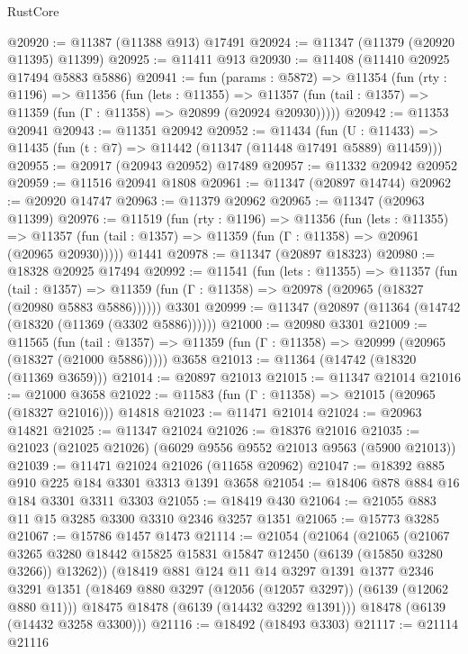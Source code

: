 \begin{lexlean}{RustCore}
\begin{coremodule}
@20920 := @11387 (@11388 @913) @17491
@20924 := @11347 (@11379 (@20920 @11395) @11399)
@20925 := @11411 @913
@20930 := @11408 (@11410 @20925 @17494 @5883 @5886)
@20941 := fun (params : @5872) =>
  @11354
    (fun (rty : @1196) =>
    @11356
      (fun (lets : @11355) =>
      @11357 (fun (tail : @1357) => @11359 (fun (Γ : @11358) => @20899 (@20924 @20930)))))
@20942 := @11353 @20941
@20943 := @11351 @20942
@20952 := @11434
    (fun (U : @11433) => @11435 (fun (t : @7) => @11442 (@11347 (@11448 @17491 @5889) @11459)))
@20955 := @20917 (@20943 @20952) @17489
@20957 := @11332 @20942 @20952
@20959 := @11516 @20941 @1808
@20961 := @11347 (@20897 @14744)
@20962 := @20920 @14747
@20963 := @11379 @20962
@20965 := @11347 (@20963 @11399)
@20976 := @11519
    (fun (rty : @1196) =>
    @11356
      (fun (lets : @11355) =>
      @11357 (fun (tail : @1357) => @11359 (fun (Γ : @11358) => @20961 (@20965 @20930)))))
    @1441
@20978 := @11347 (@20897 @18323)
@20980 := @18328 @20925 @17494
@20992 := @11541
    (fun (lets : @11355) =>
    @11357
      (fun (tail : @1357) =>
      @11359 (fun (Γ : @11358) => @20978 (@20965 (@18327 (@20980 @5883 @5886))))))
    @3301
@20999 := @11347 (@20897 (@11364 (@14742 (@18320 (@11369 (@3302 @5886))))))
@21000 := @20980 @3301
@21009 := @11565
    (fun (tail : @1357) => @11359 (fun (Γ : @11358) => @20999 (@20965 (@18327 (@21000 @5886)))))
    @3658
@21013 := @11364 (@14742 (@18320 (@11369 @3659)))
@21014 := @20897 @21013
@21015 := @11347 @21014
@21016 := @21000 @3658
@21022 := @11583 (fun (Γ : @11358) => @21015 (@20965 (@18327 @21016))) @14818
@21023 := @11471 @21014
@21024 := @20963 @14821
@21025 := @11347 @21024
@21026 := @18376 @21016
@21035 := @21023 (@21025 @21026) (@6029 @9556 @9552 @21013 @9563 (@5900 @21013))
@21039 := @11471 @21024 @21026 (@11658 @20962)
@21047 := @18392 @885 @910 @225 @184 @3301 @3313 @1391 @3658
@21054 := @18406 @878 @884 @16 @184 @3301 @3311 @3303
@21055 := @18419 @430
@21064 := @21055 @883 @11 @15 @3285 @3300 @3310 @2346 @3257 @1351
@21065 := @15773 @3285
@21067 := @15786 @1457 @1473
@21114 := @21054
    (@21064
      (@21065
        (@21067 @3265 @3280 @18442 @15825 @15831 @15847 @12450 (@6139 (@15850 @3280 @3266)) @13262))
      (@18419
        @881
        @124
        @11
        @14
        @3297
        @1391
        @1377
        @2346
        @3291
        @1351
        (@18469 @880 @3297 (@12056 (@12057 @3297)) (@6139 (@12062 @880 @11)))
        @18475
        @18478
        (@6139 (@14432 @3292 @1391)))
      @18478
      (@6139 (@14432 @3258 @3300)))
@21116 := @18492 (@18493 @3303)
@21117 := @21114 @21116

\end{coremodule}
\end{lexlean}
